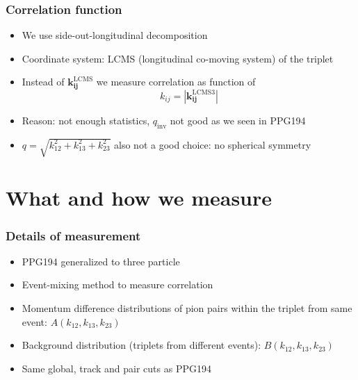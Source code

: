\documentclass{beamer}
\begin{document}
\begin{frame}
\frametitle{Correlation function}
\begin{itemize}
\setlength{\itemsep}{20pt}
\item We use side-out-longitudinal decomposition 
\item Coordinate system: LCMS (longitudinal co-moving system) of the triplet
\item Instead of $\bm{k_{ij}^{\mathrm{LCMS}}}$ we measure correlation as function of 
\begin{equation*}
k_{ij}=|\bm{k_{ij}^{\mathrm{LCMS3}}}|
\end{equation*}
\item Reason: not enough statistics, $q_\mathrm{inv}$ not good as we seen in PPG194
\item $q=\sqrt{k_{12}^2+k_{13}^2+k_{23}^2}$ also not a good choice: no spherical symmetry
\end{itemize}
\end{frame}

\section{What and how we measure}
\begin{frame}
\frametitle{Details of measurement}
\begin{itemize}
\setlength{\itemsep}{22pt}
\item PPG194 generalized to three particle
\item Event-mixing method to measure correlation
\item Momentum difference distributions of pion pairs within the triplet from same event: $A(k_{12}, k_{13}, k_{23})$
\item Background distribution (triplets from different events): $B(k_{12}, k_{13}, k_{23})$
\item Same global, track and pair cuts as PPG194
\end{itemize}
\end{frame}
\end{document}
